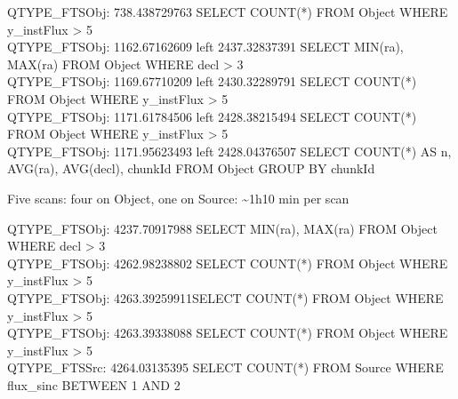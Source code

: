 \documentclass[DM,toc]{lsstdoc}
\begin{document}
QTYPE\_FTSObj: 738.438729763 SELECT COUNT(*) FROM Object WHERE
y\_instFlux \textgreater{} 5\\
QTYPE\_FTSObj: 1162.67162609 left 2437.32837391 SELECT MIN(ra), MAX(ra)
FROM Object WHERE decl \textgreater{} 3\\
QTYPE\_FTSObj: 1169.67710209 left 2430.32289791 SELECT COUNT(*) FROM
Object WHERE y\_instFlux \textgreater{} 5\\
QTYPE\_FTSObj: 1171.61784506 left 2428.38215494 SELECT COUNT(*) FROM
Object WHERE y\_instFlux \textgreater{} 5\\
QTYPE\_FTSObj: 1171.95623493 left 2428.04376507 SELECT COUNT(*) AS n,
AVG(ra), AVG(decl), chunkId FROM Object GROUP BY chunkId

Five scans: four on Object, one on Source: \textasciitilde{}1h10 min per
scan

QTYPE\_FTSObj: 4237.70917988 SELECT MIN(ra), MAX(ra) FROM Object WHERE
decl \textgreater{} 3\\
QTYPE\_FTSObj: 4262.98238802 SELECT COUNT(*) FROM Object WHERE
y\_instFlux \textgreater{} 5\\
QTYPE\_FTSObj: 4263.39259911SELECT COUNT(*) FROM Object WHERE
y\_instFlux \textgreater{} 5\\
QTYPE\_FTSObj: 4263.39338088 SELECT COUNT(*) FROM Object WHERE
y\_instFlux \textgreater{} 5\\
QTYPE\_FTSSrc: 4264.03135395 SELECT COUNT(*) FROM Source WHERE
flux\_sinc BETWEEN 1 AND 2


\end{document}
